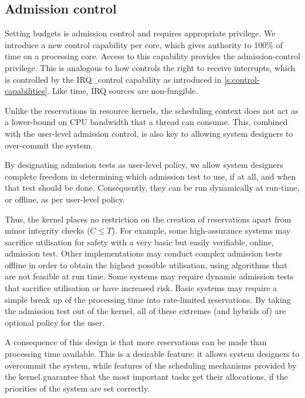\subsection{Admission control}
\label{sec:model-admission}

Setting budgets is admission control and requires appropriate
privilege. We introduce a new control capability
 per core, which gives authority to 100\% of time on a processing core.
Access to this capability provides the admission-control
privilege. This is analogous to how \selfour controls the right
to receive interrupts, which is controlled by the IRQ\_control
capability as introduced in \cref{s:control-capabilities}. Like time, IRQ sources are non-fungible.

Unlike the reservations in resource kernels, the scheduling context does not 
act as a lower-bound on CPU bandwidth that a thread can consume. This, combined with the
user-level admission control, is also key to allowing system designers to over-commit the system. 

By designating admission tests as user-level policy, we allow system designers complete freedom
in determining which admission test to use, if at all, and when that test should be done.
Consequently, they can be run dynamically at run-time, or offline, as per user-level policy.

Thus, the kernel places no restriction on the creation of reservations apart from minor integrity
checks (\ie $C \leq T$).
For example, some high-assurance systems may sacrifice utilisation for safety with a very basic but easily verifiable, online, admission test.
Other implementations may conduct complex admission tests offline in order to obtain the highest possible utilisation, using algorithms that are not feasible at run time.
Some systems may require dynamic admission tests that sacrifice utilisation or have increased risk.
Basic systems may require a simple break up of the processing time into rate-limited reservations.
By taking the admission test out of the kernel, all of these extremes (and hybrids of) are optional policy for the user.

A consequence of this design is that more reservations can be made than processing time available.
This is a desirable feature: it allows system designers to overcommit the system, while features of the scheduling mechanisms provided by the kernel guarantee that the most important tasks get their allocations, if the priorities of the system are set correctly.

